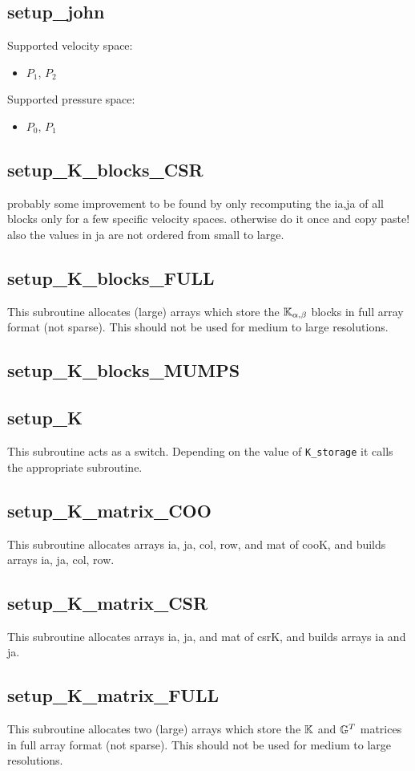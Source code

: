  \subsection{setup\_john}
 Supported velocity space:
 \begin{itemize}
 \item $P_1$, $P_2$
 \end{itemize}
 Supported pressure space:
 \begin{itemize}
 \item $P_0$, $P_1$
 \end{itemize}
 \subsection{setup\_K\_blocks\_CSR}
 probably some improvement to be found by only recomputing the ia,ja of all blocks only 
 for a few specific velocity spaces. otherwise do it once and copy paste!
 also the values in ja are not ordered from small to large.
 \subsection{setup\_K\_blocks\_FULL}
 This subroutine allocates (large) arrays which store the ${\mathbb{K}}_{\alpha,\beta}$ blocks
 in full array format (not sparse). This should not be used for medium to large resolutions.
 \subsection{setup\_K\_blocks\_MUMPS}

 \subsection{setup\_K}
 This subroutine acts as a switch. Depending on the value of {\tt K\_storage} it calls 
 the appropriate subroutine. 
 \subsection{setup\_K\_matrix\_COO}
 This subroutine allocates arrays ia, ja, col, row, and mat of cooK, 
 and builds arrays ia, ja, col, row.
 \subsection{setup\_K\_matrix\_CSR}
 This subroutine allocates arrays ia, ja, and mat of csrK, 
 and builds arrays ia and ja.
 \subsection{setup\_K\_matrix\_FULL}
 This subroutine allocates two (large) arrays which store the ${\mathbb{K}}$ and ${\mathbb{G}}^T$ matrices
 in full array format (not sparse). This should not be used for medium to large resolutions.
